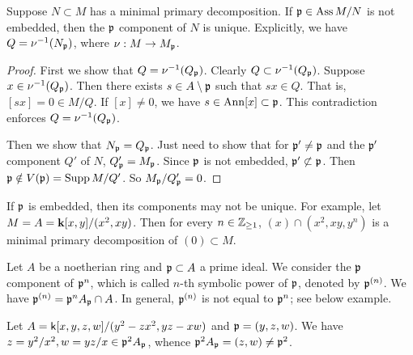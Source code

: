         \begin{proposition}\label{prop: uniqueness of primary components}
            Suppose $N\subset M$ has a minimal primary decomposition.
            If ${\mathfrak{p}} \in \operatorname{Ass} M/N$ is not embedded, then the ${\mathfrak{p}}$ component of $N$ is unique.
            Explicitly, we have $Q = \nu^{-1}(N_{\mathfrak{p}})$, where $\nu:M \to M_{{\mathfrak{p}}}$.
        \end{proposition}
        \begin{proof}
            First we show that $Q = \nu^{-1} (Q_{\mathfrak{p}})$.
            Clearly $Q \subset \nu^{-1}(Q_{\mathfrak{p}})$.
            Suppose $x \in \nu^{-1}(Q_{\mathfrak{p}})$.
            Then there exists $s \in A \setminus {\mathfrak{p}}$ such that $sx \in Q$.
            That is, $[sx] = 0 \in M/Q$.
            If $[x] \neq 0$, we have $s \in \operatorname{Ann} [x] \subset {\mathfrak{p}}$.
            This contradiction enforces $Q = \nu^{-1}(Q_{\mathfrak{p}})$.

            Then we show that $N_{\mathfrak{p}} = Q_{\mathfrak{p}}$.
            Just need to show that for ${\mathfrak{p}}' \neq {\mathfrak{p}}$ and the ${\mathfrak{p}}'$ component $Q'$ of $N$, $Q'_{\mathfrak{p}} = M_{\mathfrak{p}}$.
            Since ${\mathfrak{p}}$ is not embedded, ${\mathfrak{p}}' \not\subset {\mathfrak{p}}$.
            Then ${\mathfrak{p}} \notin V({\mathfrak{p}}) = \operatorname{Supp} M/Q'$.
            So $M_{\mathfrak{p}}/Q'_{\mathfrak{p}} = 0$.
        \end{proof}

        \begin{example}
            If ${\mathfrak{p}}$ is embedded, then its components may not be unique.
            For example, let $M = A = {\mathbf{k}}[x,y]/(x^2,xy)$.
            Then for every $n \in {\mathbb{Z}}_{\geq 1}$, $(x) \cap (x^2,xy,y^n)$ is a minimal primary decomposition of $(0) \subset M$.
        \end{example}

        Let $A$ be a noetherian ring and ${\mathfrak{p}} \subset A$ a prime ideal.
        We consider the ${\mathfrak{p}}$ component of ${\mathfrak{p}}^n$, which is called $n$-th symbolic power of ${\mathfrak{p}}$, denoted by ${\mathfrak{p}}^{(n)}$.
        We have ${\mathfrak{p}}^{(n)} = {\mathfrak{p}}^nA_{\mathfrak{p}} \cap A$.
        In general, ${\mathfrak{p}}^{(n)}$ is not equal to ${\mathfrak{p}}^n$; see below example.

        \begin{example}
            Let $A = {\mathsf{k}}[x,y,z,w]/(y^2-zx^2,yz-xw)$ and ${\mathfrak{p}} = (y,z,w)$.
            We have $z = y^2/x^2,w = yz/x \in {\mathfrak{p}}^2 A_{\mathfrak{p}}$, whence ${\mathfrak{p}}^2 A_{\mathfrak{p}} = (z,w) \neq {\mathfrak{p}}^2$.
        \end{example}
        
